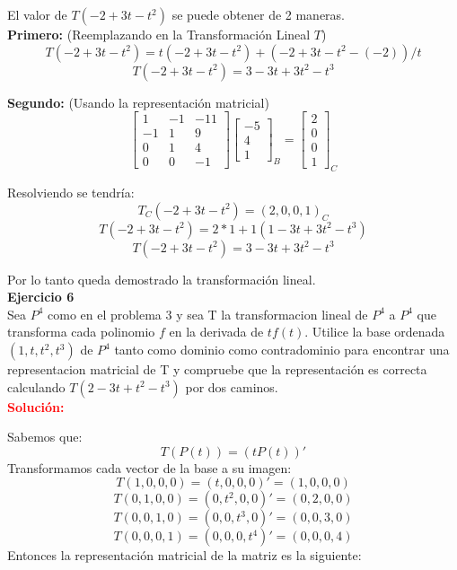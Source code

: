 \documentclass[12pt]{article}
\begin{document}
El valor de $T(-2+3t-t^2)$ se puede obtener de 2 maneras.\\
\textbf{Primero:} (Reemplazando en la Transformación Lineal $T$)\\

$$T(-2+3t-t^2) = t(-2+3t-t^2) + (-2+3t-t^2-(-2))/t$$
$$T(-2+3t-t^2) = 3-3t+3t^2-t^3$$

\textbf{Segundo:} (Usando la representación matricial)\\

$$\left[\begin{array}{ccc}
        1&-1&-11\\
        -1&1&9\\
        0&1&4\\
        0&0&-1\end{array}\right]
\left[\begin{array}{c}
        -5\\
        4\\
        1\end{array}\right]_{B}=
\left[\begin{array}{c}
        2\\
        0\\
        0\\
        1\end{array}\right]_{C}$$
        
Resolviendo se tendría:\\

$$T_{C}(-2+3t-t^2) = (2,0,0,1)_{C}$$
$$T(-2+3t-t^2) = 2*1 + 1(1-3t+3t^2-t^3)$$
$$T(-2+3t-t^2) = 3-3t+3t^2-t^3$$

Por lo tanto queda demostrado la transformación lineal.\\

\noindent \textbf{Ejercicio 6}\\
Sea $P^4$ como en el problema 3 y sea T la transformacion lineal de $P^4$ a $P^4$ que transforma cada polinomio $f$ en la derivada de $tf(t)$. Utilice la base ordenada $(1,t,t^2,t^3)$ de $P^4$ tanto como dominio como contradominio para encontrar una representacion matricial de T y compruebe que la representación es correcta calculando $T(2-3t+t^2-t^3)$ por dos caminos.
\\
\noindent \textcolor{red}{\bf Solución:}

Sabemos que:
$$T(P(t))=(tP(t))'$$
Transformamos cada vector de la base a su imagen:
$$T(1,0,0,0)=(t,0,0,0)'=(1,0,0,0)$$
$$T(0,1,0,0)=(0,t^2,0,0)'=(0,2,0,0)$$
$$T(0,0,1,0)=(0,0,t^3,0)'=(0,0,3,0)$$
$$T(0,0,0,1)=(0,0,0,t^4)'=(0,0,0,4)$$
Entonces la representación matricial de la matriz es la siguiente:
\end{document}
